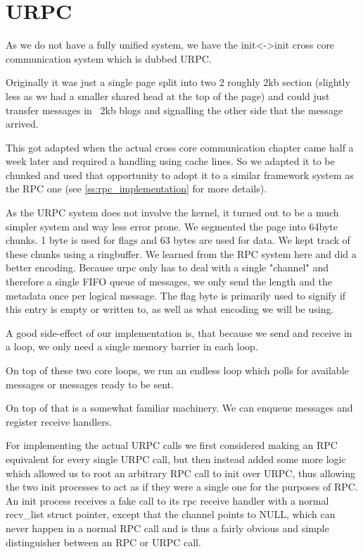 \section{URPC}\label{s:URPC}

As we do not have a fully unified system, we have the init<->init cross core 
communication system which is dubbed URPC.
\medskip

Originally it was just a single page split into two 2 roughly 2kb section 
(slightly less as we had a smaller shared head at the top of the page) and 
could just transfer messages in ~2kb blogs and signalling the other side that 
the message arrived.
\medskip

This got adapted when the actual cross core communication chapter came half a week later and required a handling using cache lines. So we 
adapted it to be chunked and used that opportunity to adopt it to a similar 
framework system as the RPC one (see \ref{ss:rpc_implementation} for more details).
\medskip

As the URPC system does not involve the kernel, it turned out to be a much 
simpler system and way less error prone. We segmented the page into 64byte chunks. 1 byte is used 
for flags and 63 bytes are used for data. We kept track of these chunks using a ringbuffer. We 
learned from the RPC system here and did a better encoding. Because urpc only has to deal with a single "channel" and therefore a single FIFO queue of messages, we only send the length and the metadata once per logical message. 
The flag byte is primarily used to signify if this entry is empty or written 
to, as well as what encoding we will be using. 
\medskip

A good side-effect of our implementation is, that because we send and receive in a loop, we only need a single 
memory barrier in each loop. 
\medskip

On top of these two core loops, we run an endless loop which polls for available messages or messages ready to be sent.
\medskip

On top of that is a somewhat 
familiar machinery. We can enqueue messages and register receive handlers. 
\medskip

For implementing the actual URPC calls we first considered making an RPC 
equivalent for every single URPC call, but then instead added some more 
logic which allowed us to root an arbitrary RPC call to init over 
URPC, thus allowing the two init processes to act as if they were a single one 
for the purposes of RPC.
An init process receives a fake call to its rpc receive handler with a 
normal recv\_list struct pointer, except that the channel points to NULL, which can 
never happen in a normal RPC call and is thus a fairly obvious and simple 
distinguisher between an RPC or URPC call.
\medskip

